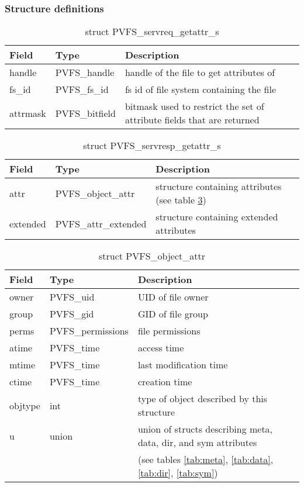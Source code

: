 \documentclass[11pt, letterpaper]{article} %
\begin{document}
\subsubsection{Structure definitions}

\begin{table}[H]
\begin{tabular}{|l|l|l|}
\hline
Field & Type & Description \\
\hline
\hline
handle & PVFS\_handle & handle of the file to get attributes of\\
\hline
fs\_id & PVFS\_fs\_id & fs id of file system containing the file\\
\hline
attrmask & PVFS\_bitfield & bitmask used to restrict the set of
attribute fields that are returned\\
\hline
\end{tabular}
\caption{struct PVFS\_servreq\_getattr\_s \label{tab:reqgetattr}}
\end{table}

\begin{table}[H]
\begin{tabular}{|l|l|l|}
\hline
Field & Type & Description \\
\hline
\hline
attr & PVFS\_object\_attr & structure containing attributes (see table
\ref{tab:attr})\\
\hline
extended & PVFS\_attr\_extended & structure containing extended
attributes\\
\hline
\end{tabular}
\caption{struct PVFS\_servresp\_getattr\_s \label{tab:respgetattr}}
\end{table}

\begin{table}[H]
\begin{tabular}{|l|l|l|}
\hline
Field & Type & Description \\
\hline
\hline
owner & PVFS\_uid & UID of file owner\\
\hline
group & PVFS\_gid & GID of file group\\
\hline
perms & PVFS\_permissions & file permissions\\
\hline
atime & PVFS\_time & access time\\
\hline
mtime & PVFS\_time & last modification time\\
\hline
ctime & PVFS\_time & creation time\\
\hline
objtype & int & type of object described by this structure\\
\hline
u & union & union of structs describing meta, data, dir, and sym
attributes\\ 
 & & (see tables \ref{tab:meta}, \ref{tab:data}, \ref{tab:dir}, \ref{tab:sym})\\
\hline
\end{tabular}
\caption{struct PVFS\_object\_attr \label{tab:attr}}
\end{table}
\end{document}
